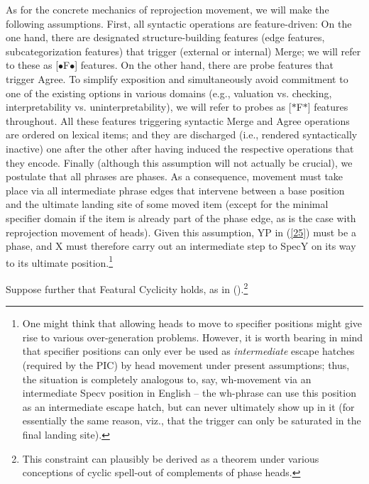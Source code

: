\documentclass[output=paper
,modfonts
,nonflat]{langsci/langscibook}
\begin{document}
	As for the concrete mechanics of reprojection movement, we will make
	the following assumptions. First,  all syntactic operations are
	feature-driven: On the one hand, there are designated   structure-building features (edge features, subcategorization
	features) that trigger (external or internal) Merge; we will refer to
	these as [{\small $\bullet$}F{\small $\bullet$}] features. On the
	other hand, there are   probe features that trigger Agree. To simplify
	exposition and simultaneously avoid commitment to one of the existing options in
	various domains (e.g., valuation vs. checking, interpretability
	vs. uninterpretability), we will refer to probes as 
	[$*$F$*$] features throughout.
	All these features triggering syntactic Merge and Agree operations are
	ordered on lexical items; and they are discharged (i.e., rendered
	syntactically inactive) one after the other
	after having induced the respective operations that they encode. 
	Finally (although this assumption will not actually be crucial), we
	postulate that all phrases are phases. As a consequence, movement must take place via all
	intermediate phrase edges  that intervene between a base position and
	the ultimate landing site of some moved item (except for the minimal
	specifier domain if the item is already part of the phase edge, as
	is the case with reprojection movement of heads). Given this
	assumption, YP in (\ref{25}) must be a phase, and X must therefore
	carry out an intermediate step to SpecY on its way to its ultimate
	position.\footnote{One might think that allowing heads to move to
		specifier positions might give rise to various over-generation
		problems. However, it is worth bearing in mind that specifier
		positions can only ever be used as {\itshape intermediate} escape
		hatches (required by the PIC) by head movement under present
		assumptions; thus, the situation is completely analogous to, say,
		wh-movement via an intermediate Specv position in English -- the
		wh-phrase can use this position as an intermediate escape hatch,
		but can never ultimately show up in it (for essentially the same
		reason, viz., that the trigger can only be saturated in the final
		landing site).}
	
	Suppose further that Featural Cyclicity holds, as in
	(\Next).\footnote{This constraint can plausibly be derived as a theorem
		under various conceptions of cyclic spell-out of complements of
		phase heads.}
	
\end{document}
